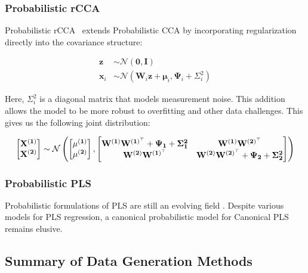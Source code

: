 \subsubsection{Probabilistic rCCA}

Probabilistic rCCA~\cite{de2003regularization} extends Probabilistic CCA by incorporating regularization directly into the covariance structure:

\begin{align}
    \mathbf{z}& \sim \mathcal{N}(\mathbf{0}, \mathbf{I})                                            \\
    \mathbf{x}_i & \sim \mathcal{N}(\mathbf{W}_i \mathbf{z} + \boldsymbol{\mu}_i, \boldsymbol{\Psi}_i + \Sigma_i^2)
\end{align}

Here, \(\Sigma_i^2\) is a diagonal matrix that models measurement noise. This addition allows the model to be more
robust to overfitting and other data challenges. This gives us the following joint distribution:

\begin{align}
    \begin{bmatrix} \bold{X^{(1)}} \\ \bold{X^{(2)}} \end{bmatrix} \sim \mathcal{N} \left( \begin{bmatrix} \bold{\mu^{(1)}} \\ \bold{\mu^{(2)}} \end{bmatrix}, \begin{bmatrix} \bold{W^{(1)}W^{(1)^{\top}}} + \bold{\Psi_1} + \bold{\Sigma_1^2} & \bold{W^{(1)}W^{(2)^{\top}}} \\ \bold{W^{(2)}W^{(1)^{\top}}} & \bold{W^{(2)}W^{(2)^{\top}}} + \bold{\Psi_2} + \bold{\Sigma_2^2} \end{bmatrix} \right)
\end{align}

\subsubsection{Probabilistic PLS}

Probabilistic formulations of PLS are still an evolving field \cite{el2018probabilistic,zheng2016probabilistic}.
Despite various models for PLS regression, a canonical probabilistic model for Canonical PLS remains elusive.

\subsection{Summary of Data Generation Methods}

